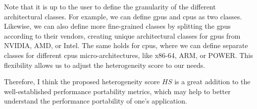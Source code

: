 Note that it is up to the user to define the granularity of the different architectural classes. 
For example, we can define \glspl{gpu} and \glspl{cpu} as two classes. 
Likewise, we can also define more fine-grained classes by splitting the \glspl{gpu} according to their vendors, creating unique architectural classes for \glspl{gpu} from NVIDIA, AMD, or Intel. 
The same holds for \glspl{cpu}, where we can define separate classes for different \glspl{cpu} micro-architectures, like x86-64, ARM, or POWER. 
This flexibility allows us to adjust the heterogeneity score to our needs. 

Therefore, I think the proposed heterogeneity score $HS$ is a great addition to the well-established performance portability metrics, which may help to better understand the performance portability of one's application. 

